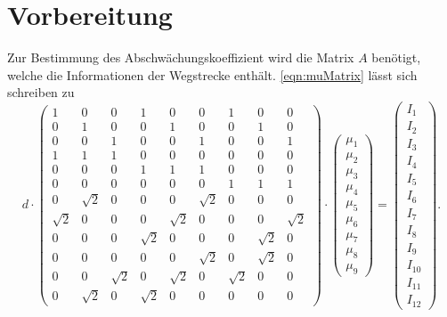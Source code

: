 \section{Vorbereitung}
\label{sec:Vorbereitung}
Zur Bestimmung des Abschwächungskoeffizient wird die Matrix $A$ benötigt, welche die Informationen der Wegstrecke enthält. \autoref{eqn:muMatrix} lässt sich schreiben zu
\begin{equation}
    d \cdot
    \begin{pmatrix}
        1 & 0 & 0 & 1 & 0 & 0 & 1 & 0 & 0 \\
        0 & 1 & 0 & 0 & 1 & 0 & 0 & 1 & 0 \\
        0 & 0 & 1 & 0 & 0 & 1 & 0 & 0 & 1 \\
        1 & 1 & 1 & 0 & 0 & 0 & 0 & 0 & 0 \\
        0 & 0 & 0 & 1 & 1 & 1 & 0 & 0 & 0 \\
        0 & 0 & 0 & 0 & 0 & 0 & 1 & 1 & 1 \\
        0 & \sqrt{2} & 0 & 0 & 0 & \sqrt{2} & 0 & 0 & 0 \\
        \sqrt{2} & 0 & 0 & 0 & \sqrt{2} & 0 & 0 & 0 & \sqrt{2} \\
        0 & 0 & 0 & \sqrt{2} & 0 & 0 & 0 & \sqrt{2} & 0 \\
        0 & 0 & 0 & 0 & 0 & \sqrt{2} & 0 & \sqrt{2} & 0 \\
        0 & 0 & \sqrt{2} & 0 & \sqrt{2} & 0 & \sqrt{2} & 0 & 0 \\
        0 & \sqrt{2} & 0 & \sqrt{2} & 0 & 0 & 0 & 0 & 0 
    \end{pmatrix}
    \cdot
    \begin{pmatrix}
        \mu_1 \\
        \mu_2 \\
        \mu_3 \\
        \mu_4 \\
        \mu_5 \\
        \mu_6 \\
        \mu_7 \\
        \mu_8 \\
        \mu_9 
    \end{pmatrix}
    =
    \begin{pmatrix}
        I_1 \\
        I_2 \\
        I_3 \\
        I_4 \\
        I_5 \\
        I_6 \\
        I_7 \\
        I_8 \\
        I_9 \\
        I_{10} \\
        I_{11} \\
        I_{12} 
    \end{pmatrix}
    .
\end{equation}
